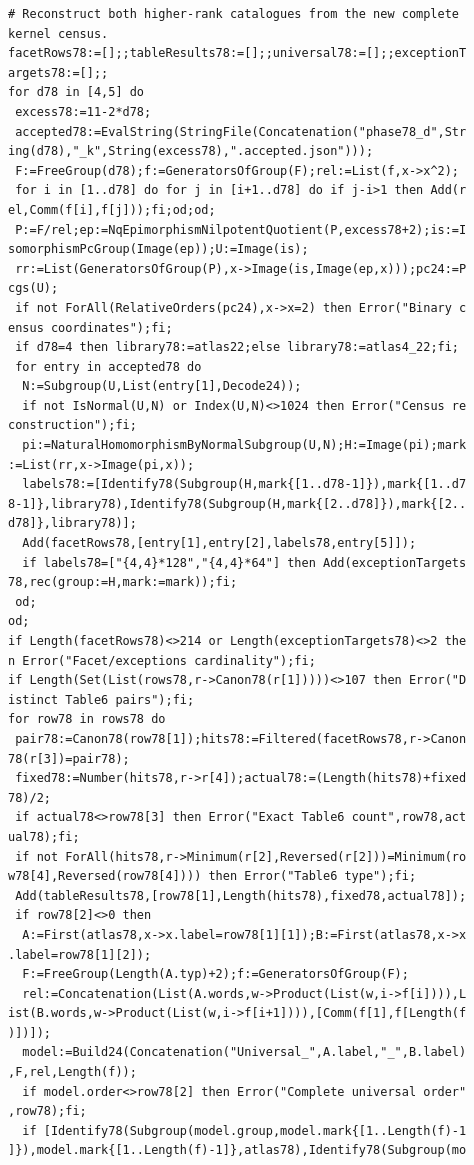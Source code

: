 \documentclass[
  11pt,
  a4paper,
]{article}
\begin{document}
\begin{verbatim}
# Reconstruct both higher-rank catalogues from the new complete 
kernel census.
facetRows78:=[];;tableResults78:=[];;universal78:=[];;exceptionT
argets78:=[];;
for d78 in [4,5] do
 excess78:=11-2*d78;
 accepted78:=EvalString(StringFile(Concatenation("phase78_d",Str
ing(d78),"_k",String(excess78),".accepted.json")));
 F:=FreeGroup(d78);f:=GeneratorsOfGroup(F);rel:=List(f,x->x^2);
 for i in [1..d78] do for j in [i+1..d78] do if j-i>1 then Add(r
el,Comm(f[i],f[j]));fi;od;od;
 P:=F/rel;ep:=NqEpimorphismNilpotentQuotient(P,excess78+2);is:=I
somorphismPcGroup(Image(ep));U:=Image(is);
 rr:=List(GeneratorsOfGroup(P),x->Image(is,Image(ep,x)));pc24:=P
cgs(U);
 if not ForAll(RelativeOrders(pc24),x->x=2) then Error("Binary c
ensus coordinates");fi;
 if d78=4 then library78:=atlas22;else library78:=atlas4_22;fi;
 for entry in accepted78 do
  N:=Subgroup(U,List(entry[1],Decode24));
  if not IsNormal(U,N) or Index(U,N)<>1024 then Error("Census re
construction");fi;
  pi:=NaturalHomomorphismByNormalSubgroup(U,N);H:=Image(pi);mark
:=List(rr,x->Image(pi,x));
  labels78:=[Identify78(Subgroup(H,mark{[1..d78-1]}),mark{[1..d7
8-1]},library78),Identify78(Subgroup(H,mark{[2..d78]}),mark{[2..
d78]},library78)];
  Add(facetRows78,[entry[1],entry[2],labels78,entry[5]]);
  if labels78=["{4,4}*128","{4,4}*64"] then Add(exceptionTargets
78,rec(group:=H,mark:=mark));fi;
 od;
od;
if Length(facetRows78)<>214 or Length(exceptionTargets78)<>2 the
n Error("Facet/exceptions cardinality");fi;
if Length(Set(List(rows78,r->Canon78(r[1]))))<>107 then Error("D
istinct Table6 pairs");fi;
for row78 in rows78 do
 pair78:=Canon78(row78[1]);hits78:=Filtered(facetRows78,r->Canon
78(r[3])=pair78);
 fixed78:=Number(hits78,r->r[4]);actual78:=(Length(hits78)+fixed
78)/2;
 if actual78<>row78[3] then Error("Exact Table6 count",row78,act
ual78);fi;
 if not ForAll(hits78,r->Minimum(r[2],Reversed(r[2]))=Minimum(ro
w78[4],Reversed(row78[4]))) then Error("Table6 type");fi;
 Add(tableResults78,[row78[1],Length(hits78),fixed78,actual78]);
 if row78[2]<>0 then
  A:=First(atlas78,x->x.label=row78[1][1]);B:=First(atlas78,x->x
.label=row78[1][2]);
  F:=FreeGroup(Length(A.typ)+2);f:=GeneratorsOfGroup(F);
  rel:=Concatenation(List(A.words,w->Product(List(w,i->f[i]))),L
ist(B.words,w->Product(List(w,i->f[i+1]))),[Comm(f[1],f[Length(f
)])]);
  model:=Build24(Concatenation("Universal_",A.label,"_",B.label)
,F,rel,Length(f));
  if model.order<>row78[2] then Error("Complete universal order"
,row78);fi;
  if [Identify78(Subgroup(model.group,model.mark{[1..Length(f)-1
]}),model.mark{[1..Length(f)-1]},atlas78),Identify78(Subgroup(mo

\end{verbatim}
\end{document}
